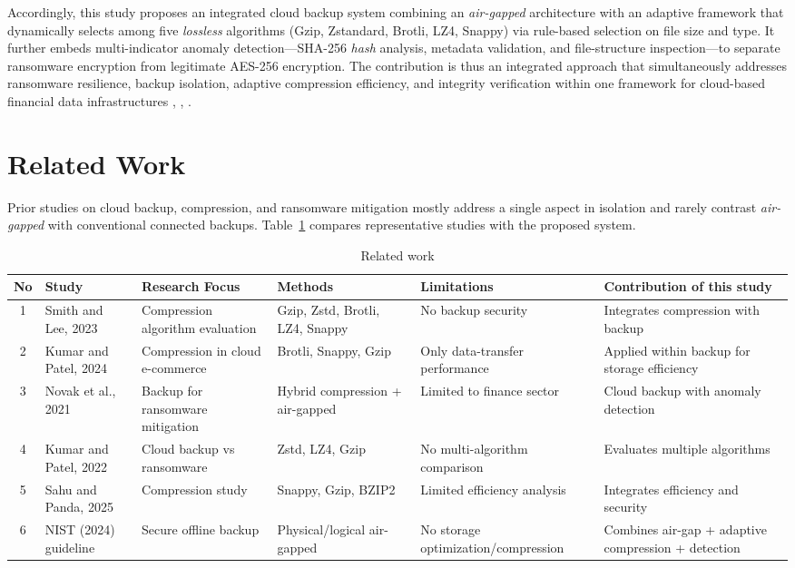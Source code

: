 \documentclass{iaesarticle}
\begin{document}
Accordingly, this study proposes an integrated cloud backup system combining an \textit{air-gapped} architecture with an adaptive framework that dynamically selects among five \textit{lossless} algorithms (Gzip, Zstandard, Brotli, LZ4, Snappy) via rule-based selection on file size and type. It further embeds multi-indicator anomaly detection---SHA-256 \textit{hash} analysis, metadata validation, and file-structure inspection---to separate ransomware encryption from legitimate AES-256 encryption. The contribution is thus an integrated approach that simultaneously addresses ransomware resilience, backup isolation, adaptive compression efficiency, and integrity verification within one framework for cloud-based financial data infrastructures \cite{18}, \cite{19}, \cite{20}.

\section{Related Work}
\label{sec:related_work}
Prior studies on cloud backup, compression, and ransomware mitigation mostly address a single aspect in isolation and rarely contrast \textit{air-gapped} with conventional connected backups. Table~\ref{tab:related_work} compares representative studies with the proposed system.

\begin{table}[H]
\centering
\fontsize{8pt}{10pt}\selectfont
\caption{Related work}
\label{tab:related_work}
\begin{tabularx}{\textwidth}{@{}c p{2.2cm} X X X X@{}}
\hline
\textbf{No} & \textbf{Study} & \textbf{Research Focus} & \textbf{Methods} & \textbf{Limitations} & \textbf{Contribution of this study} \\
\hline
1 & Smith and Lee, 2023 & Compression algorithm evaluation & Gzip, Zstd, Brotli, LZ4, Snappy & No backup security & Integrates compression with backup \\
2 & Kumar and Patel, 2024 & Compression in cloud e-commerce & Brotli, Snappy, Gzip & Only data-transfer performance & Applied within backup for storage efficiency \\
3 & Novak et al., 2021 & Backup for ransomware mitigation & Hybrid compression + air-gapped & Limited to finance sector & Cloud backup with anomaly detection \\
4 & Kumar and Patel, 2022 & Cloud backup vs ransomware & Zstd, LZ4, Gzip & No multi-algorithm comparison & Evaluates multiple algorithms \\
5 & Sahu and Panda, 2025 & Compression study & Snappy, Gzip, BZIP2 & Limited efficiency analysis & Integrates efficiency and security \\
6 & NIST (2024) guideline & Secure offline backup & Physical/logical air-gapped & No storage optimization/compression & Combines air-gap + adaptive compression + detection \\
\hline
\end{tabularx}
\end{table}
\end{document}
